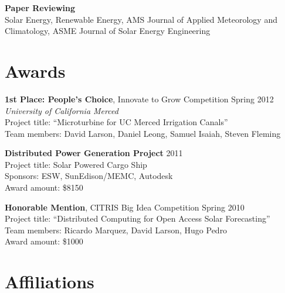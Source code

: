\documentclass[]{res}
\begin{document}
\begin{resume}
\textbf{Paper Reviewing} \\
Solar Energy, Renewable Energy, AMS Journal of Applied Meteorology and
Climatology, ASME Journal of Solar Energy Engineering


%
\section{Awards}
\vspace{0.1in}

\textbf{1st Place: People's Choice}, Innovate to Grow Competition \hfill Spring 2012 \\
\textit{University of California Merced} \\
Project title: ``Microturbine for UC Merced Irrigation Canals'' \\
Team members: David Larson, Daniel Leong, Samuel Isaiah, Steven Fleming

\textbf{Distributed Power Generation Project} \hfill 2011 \\
Project title: Solar Powered Cargo Ship \\
Sponsors: ESW, SunEdison/MEMC, Autodesk \\
Award amount: \$8150

\textbf{Honorable Mention}, CITRIS Big Idea Competition \hfill Spring 2010 \\
Project title: ``Distributed Computing for Open Access Solar Forecasting'' \\
Team members: Ricardo Marquez, David Larson, Hugo Pedro \\
Award amount: \$1000



\section{Affiliations}
\vspace{0.1in}


\end{resume}
\end{document}
